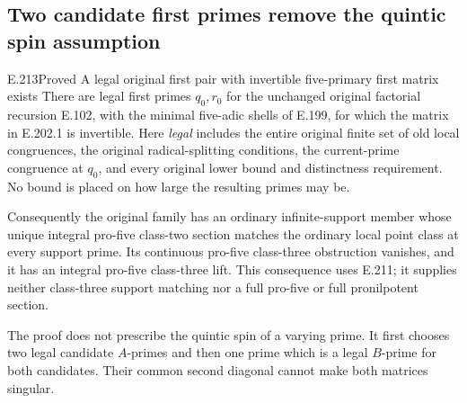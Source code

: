 \subsection{Two candidate first primes remove the quintic spin assumption}

\begin{result}{E.213}{Proved}
{A legal original first pair with invertible five-primary first matrix exists}
There are legal first primes $q_0,r_0$ for the unchanged original
factorial recursion E.102, with the minimal five-adic shells of
E.199, for which the matrix in E.202.1 is invertible.
Here \emph{legal} includes the entire original finite set of old
local congruences, the original radical-splitting conditions,
the current-prime congruence at $q_0$, and every original lower
bound and distinctness requirement. No bound is placed on how
large the resulting primes may be.

Consequently the original family has an ordinary infinite-support
member whose unique integral pro-five class-two section matches
the ordinary local point class at every support prime. Its
continuous pro-five class-three obstruction vanishes, and it has
an integral pro-five class-three lift. This consequence uses
E.211; it supplies neither class-three support matching nor a
full pro-five or full pronilpotent section.

The proof does not prescribe the quintic spin of a varying
prime. It first chooses two legal candidate $A$-primes and
then one prime which is a legal $B$-prime for both candidates.
Their common second diagonal cannot make both matrices singular.
\end{result}

